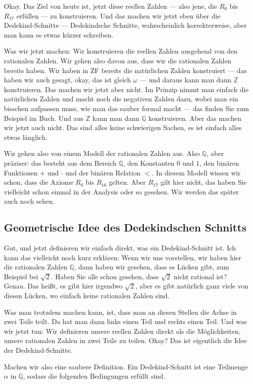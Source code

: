 \begin{spoken-clean}[00:20:49 - 00:23:00]
Okay. Das Ziel von heute ist, jetzt diese reellen Zahlen --- also jene, die $R_0$ bis $R_{17}$ erfüllen --- zu konstruieren. Und das machen wir jetzt eben über die Dedekind-Schnitte --- Dedekindsche Schnitte, wahrscheinlich korrekterweise, aber man kann es etwas kürzer schreiben.

Was wir jetzt machen: Wir konstruieren die reellen Zahlen ausgehend von den rationalen Zahlen. Wir gehen also davon aus, dass wir die rationalen Zahlen bereits haben. Wir haben in ZF bereits die natürlichen Zahlen konstruiert --- das haben wir auch gesagt, okay, das ist gleich $\omega$ --- und daraus kann man dann $\mathbb{Z}$ konstruieren. Das machen wir jetzt aber nicht. Im Prinzip nimmt man einfach die natürlichen Zahlen und macht noch die negativen Zahlen dazu, wobei man ein bisschen aufpassen muss, wie man das sauber formal macht --- das finden Sie zum Beispiel im Buch. Und aus $\mathbb{Z}$ kann man dann $\mathbb{Q}$ konstruieren. Aber das machen wir jetzt auch nicht. Das sind alles keine schwierigen Sachen, es ist einfach alles etwas länglich.

Wir gehen also von einem Modell der rationalen Zahlen aus. Also $\mathbb{Q}$, aber präziser: das besteht aus dem Bereich $\mathbb{Q}$, den Konstanten $0$ und $1$, den binären Funktionen $+$ und $\cdot$ und der binären Relation $<$. In diesem Modell wissen wir schon, dass die Axiome $R_0$ bis $R_{16}$ gelten. Aber $R_{17}$ gilt hier nicht, das haben Sie vielleicht schon einmal in der Analysis oder so gesehen. Wir werden das später auch noch sehen.
\end{spoken-clean}

\subsection{Geometrische Idee des Dedekindschen Schnitts}

\begin{spoken-clean}[00:23:00 - 00:25:30]
Gut, und jetzt definieren wir einfach direkt, was ein Dedekind-Schnitt ist. Ich kann das vielleicht noch kurz erklären: Wenn wir uns vorstellen, wir haben hier die rationalen Zahlen $\mathbb{Q}$, dann haben wir gesehen, dass es Lücken gibt, zum Beispiel bei $\sqrt{2}$. Haben Sie alle schon gesehen, dass $\sqrt{2}$ nicht rational ist? Genau. Das heißt, es gibt hier irgendwo $\sqrt{2}$, aber es gibt natürlich ganz viele von diesen Lücken, wo einfach keine rationalen Zahlen sind.

Was man trotzdem machen kann, ist, dass man an diesen Stellen die Achse in zwei Teile teilt. Da hat man dann links einen Teil und rechts einen Teil. Und was wir jetzt tun: Wir definieren unsere reellen Zahlen direkt als die Möglichkeiten, unsere rationalen Zahlen in zwei Teile zu teilen. Okay? Das ist eigentlich die Idee der Dedekind-Schnitte.

Machen wir also eine saubere Definition. Ein Dedekind-Schnitt ist eine Teilmenge $\alpha$ in $\mathbb{Q}$, sodass die folgenden Bedingungen erfüllt sind.
\end{spoken-clean}

